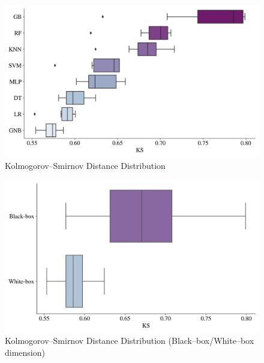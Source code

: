 \begin{figure}[H]
    \centering
    \caption{Kolmogorov--Smirnov Distance Distribution}\vspace{0.5em}
    \label{fig:ksdist}
    \includegraphics[width=140mm]{Figures/KS_Distribution.jpg}
    
    \vspace{-1em}
\end{figure}

\begin{figure}[H]
    \centering
    \caption{Kolmogorov--Smirnov Distance Distribution (Black--box/White--box dimension)}\vspace{0.5em}
    \label{fig:ksdistbbwb}
    \includegraphics[width=140mm]{Figures/KS_Distribution_BB_WB.jpg}
    
    \vspace{-1em}
\end{figure}

